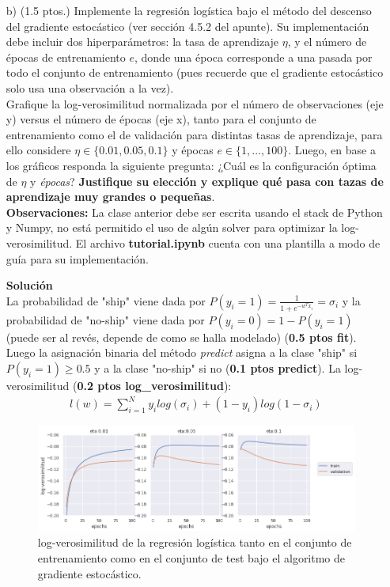 \documentclass[11pt,letterpaper]{article}
\begin{document}
\begin{enumerate}
\item[b)] (1.5 ptos.) Implemente la regresión logística bajo el método del descenso del gradiente estocástico (ver sección 4.5.2 del apunte). Su implementación debe incluir dos hiperparámetros:  la tasa de aprendizaje $\eta$, y el número de épocas de entrenamiento $e$, donde una época corresponde a una pasada por todo el conjunto de entrenamiento (pues recuerde que el gradiente estocástico solo usa una observación a la vez).  \\
Grafique la log-verosimilitud normalizada por el número de observaciones (eje y) versus el número de épocas (eje x), tanto para el conjunto de entrenamiento como el de validación para distintas tasas de aprendizaje, para ello considere $\eta \in  \{0.01, 0.05, 0.1\}$ y {épocas} $e\in \{1,\ldots, 100\}$. Luego, en base a los gráficos responda la siguiente pregunta:
¿Cuál es la configuración óptima de $\eta$ y \textit{épocas}? \textbf{Justifique su elección y explique qué pasa con tazas de aprendizaje muy grandes o pequeñas}.\\
\textbf{Observaciones:} La clase anterior debe ser escrita usando el stack de Python y Numpy, no está permitido el uso de algún solver para optimizar la log-verosimilitud. El archivo \textbf{tutorial.ipynb} cuenta con una plantilla a modo de guía para su implementación.

\textbf{Solución}\\

La probabilidad de "ship" viene dada por $P(y_{i}=1) = \frac{1}{1+e^{-w^{T}x_{i}}}=\sigma_{i}$ y la probabilidad de "no-ship" viene dada por $P(y_{i}=0) = 1-P(y_{i}=1)$ (puede ser al revés, depende de como se halla modelado) (\textbf{0.5 ptos fit}). Luego la asignación binaria del método \textit{predict} asigna a la clase "ship" si $P(y_{i}=1)\geq 0.5$ y a la clase "no-ship" si no (\textbf{0.1 ptos predict}). La log-verosimilitud (\textbf{0.2 ptos log\_verosimilitud}):
\begin{align*}
    l(w) = \sum_{i=1}^{N}y_{i}log(\sigma_{i})+(1-y_{i})log(1-\sigma_{i})
\end{align*}

\begin{figure}[H]
    \includegraphics[scale=0.62]{log_likelihood.png}
    \caption{log-verosimilitud de la regresión logística tanto en el conjunto de entrenamiento como en el conjunto de test bajo el algoritmo de gradiente estocástico.}
\end{figure}


\end{enumerate}
\end{document}
